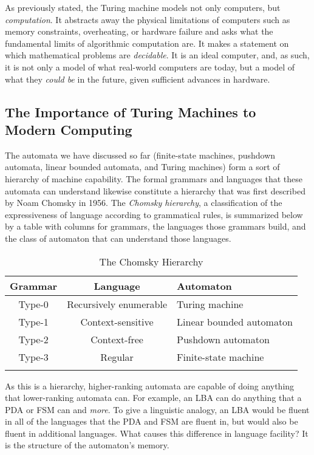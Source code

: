 As previously stated, the Turing machine models not only computers, but \textit{computation}. It abstracts away the physical limitations of computers such as memory constraints, overheating, or hardware failure and asks what the fundamental limits of algorithmic computation are. It makes a statement on which mathematical problems are \textit{decidable}. It is an ideal computer, and, as such, it is not only a model of what real-world computers are today, but a model of what they \textit{could be} in the future, given sufficient advances in hardware. \\


\subsection{The Importance of Turing Machines to Modern Computing}

The automata we have discussed so far (finite-state machines, pushdown automata, linear bounded automata, and Turing machines) form a sort of hierarchy of machine capability. The formal grammars and languages that these automata can understand likewise constitute a hierarchy that was first described by Noam Chomsky in 1956. The \textit{Chomsky hierarchy}, a classification of the expressiveness of language according to grammatical rules, is summarized below by a table with columns for grammars, the languages those grammars build, and the class of automaton that can understand those languages.

\begin{table}[H]
	\caption{The Chomsky Hierarchy}
	\label{tab:LABEL}
	\begin{tabularx}{\textwidth}{|c|c|Y|}
		\hline
		Grammar & Language & Automaton \\
		\hline
		Type-0 & Recursively enumerable & Turing machine \\
		Type-1 & Context-sensitive & Linear bounded automaton \\
		Type-2 & Context-free & Pushdown automaton \\
		Type-3 & Regular & Finite-state machine \\
		\hline
	\end{tabularx}
\end{table}

As this is a hierarchy, higher-ranking automata are capable of doing anything that lower-ranking automata can. For example, an LBA can do anything that a PDA or FSM can and \textit{more}. To give a linguistic analogy, an LBA would be fluent in all of the languages that the PDA and FSM are fluent in, but would also be fluent in additional languages. What causes this difference in language facility? It is the structure of the automaton's memory. \\

